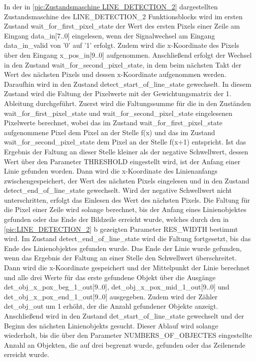 \documentclass[ngerman,12pt]{article} %
\begin{document}
{In der in \autoref{pic:Zustandsmaschine LINE_DETECTION_2} dargestellten Zustandsmaschine des LINE\_DETECTION\_2 Funktionsblocks wird im ersten Zustand wait\_for\_first\_pixel\_state der Wert des ersten Pixels einer Zeile am Eingang data\_in[7..0] eingelesen, wenn der Signalwechsel am Eingang data\_in\_valid von '0' auf '1' erfolgt. Zudem wird die x-Koordinate des Pixels über den Eingang x\_pos\_in[9..0] aufgenommen. Anschließend erfolgt der Wechsel in den Zustand wait\_for\_second\_pixel\_state, in dem beim nächsten Takt der Wert des nächsten Pixels und dessen x-Koordinate aufgenommen werden. Daraufhin wird in den Zustand detect\_start\_of\_line\_state gewechselt. In diesem Zustand wird die Faltung der Pixelwerte mit der Gewichtungsmatrix der 1. Ableitung durchgeführt. Zuerst wird die Faltungssumme für die in den Zuständen wait\_for\_first\_pixel\_state und wait\_for\_second\_pixel\_state eingelesenen Pixelwerte berechnet, wobei das im Zustand wait\_for\_first\_pixel\_state aufgenommene Pixel dem Pixel an der Stelle f(x) und das im Zustand wait\_for\_second\_pixel\_state dem Pixel an der Stelle f(x+1) entspricht. Ist das Ergebnis der Faltung an dieser Stelle kleiner als der negative Schwellwert, dessen Wert über den Parameter THRESHOLD eingestellt wird, ist der Anfang einer Linie gefunden worden. Dann wird die x-Koordinate des Linienanfangs zwischengespeichert, der Wert des nächsten Pixels eingelesen und in den Zustand detect\_end\_of\_line\_state gewechselt. Wird der negative Schwellwert nicht unterschritten, erfolgt das Einlesen des Wert des nächsten Pixels. Die Faltung für die Pixel einer Zeile wird solange berechnet, bis der Anfang eines Linienobjektes gefunden oder das Ende der Bildzeile erreicht wurde, welches durch den in \autoref{pic:LINE_DETECTION_2} b gezeigten Parameter RES\_WIDTH bestimmt wird. Im Zustand detect\_end\_of\_line\_state wird die Faltung fortgesetzt, bis das Ende des Linienobjektes gefunden wurde. Das Ende der Linie wurde gefunden, wenn das Ergebnis der Faltung an einer Stelle den Schwellwert überschreitet. Dann wird die x-Koordinate gespeichert und der Mittelpunkt der Linie berechnet und alle drei Werte für das erste gefundene Objekt über die Ausgänge det\_obj\_x\_pox\_beg\_1\_out[9..0], det\_obj\_x\_pox\_mid\_1\_out[9..0] und det\_obj\_x\_pox\_end\_1\_out[9..0] ausgegeben. Zudem wird der Zähler det\_obj\_out um 1 erhöht, der die Anzahl gefundener Objekte anzeigt. Anschließend wird in den Zustand det\_start\_of\_line\_state gewechselt und der Beginn des nächsten Linienobjekts gesucht. Dieser Ablauf wird solange wiederholt, bis die über den Parameter NUMBERS\_OF\_OBJECTES eingestellte Anzahl an Objekten, die auf drei begrenzt wurde, gefunden oder das Zeilenende erreicht wurde.\newline

}
\end{document}

